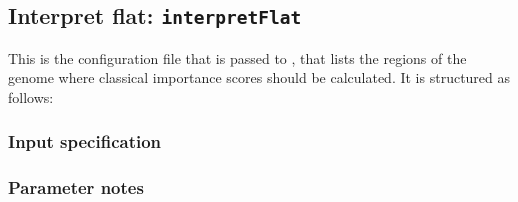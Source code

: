 \documentclass{article}
\begin{document}
\subsection{Interpret flat: \texttt{interpretFlat}}\label{prog:interpretFlat}

This is the configuration file that is passed to , that
lists the regions of the genome where classical importance scores should be
calculated.
It is structured as follows:

\subsubsection{Input specification}



\subsubsection{Parameter notes}
\end{document}
